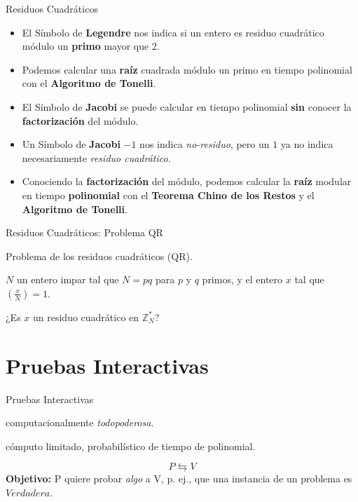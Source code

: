 \documentclass{beamer}
\begin{document}
\begin{frame}{Residuos Cuadráticos}
	\begin{itemize}
		\item El Símbolo de \textbf{Legendre} nos indica si un entero es residuo cuadrático módulo un \textbf{primo} mayor que 2.
		\item Podemos calcular una \textbf{raíz} cuadrada módulo un primo en tiempo polinomial con el \textbf{Algoritmo de Tonelli}.
		\item El Símbolo de \textbf{Jacobi} se puede calcular en tiempo polinomial \textbf{sin} conocer la \textbf{factorización} del módulo.
		\item Un Símbolo de \textbf{Jacobi} $-1$ nos indica \textit{no-residuo}, pero un $1$ ya no indica necesariamente \textit{residuo cuadrático}.
		\item Conociendo la \textbf{factorización} del módulo, podemos calcular la \textbf{raíz} modular en tiempo \textbf{polinomial} con el \textbf{Teorema Chino de los Restos} y el \textbf{Algoritmo de Tonelli}.
	\end{itemize}
\end{frame}


\begin{frame}{Residuos Cuadráticos: Problema QR}
	\begin{description}[Parámetros]
		\item[Nombre] Problema de los residuos cuadr\'aticos (QR).
		\item[Parámetros] $N$ un entero impar tal que $N = pq$ para $p$ y $q$ primos, y el entero $x$ tal que $\left( \frac{x}{N} \right) = 1$.
		\item[Pregunta] ¿Es $x$ un residuo cuadrático en ${\mathbb Z}_N^*$?
	\end{description}
\end{frame}


\section{Pruebas Interactivas}

\begin{frame}{Pruebas Interactivas}
	
	\begin{description}[Verificador (V)]
		\item[Probador (P)] computacionalmente \textit{todopoderosa}.
		\item[Verificador (V)] cómputo limitado, probabilístico de tiempo de polinomial.	
	\end{description}
	{\Large\[P \leftrightarrows  V\]}
	\textbf{Objetivo:} P quiere probar \textit{algo} a V, p. ej., que una instancia de un problema es $Verdadera$.

\end{frame}
\end{document}
